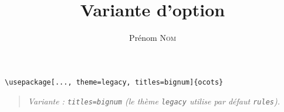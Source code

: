 \documentclass[11pt]{ocots-book}
\title{Variante d'option}
\author{Prénom \textsc{Nom}}
\newcommand{\ocotsvariantnote}[1]{\begin{quote}\itshape Variante : #1\end{quote}}
\begin{document}
\maketitle

\begin{lstlisting}
\usepackage[..., theme=legacy, titles=bignum]{ocots}
\end{lstlisting}
\ocotsvariantnote{\texttt{titles=bignum} (le th\`eme \texttt{legacy} utilise par d\'efaut \texttt{rules}).}

\end{document}
